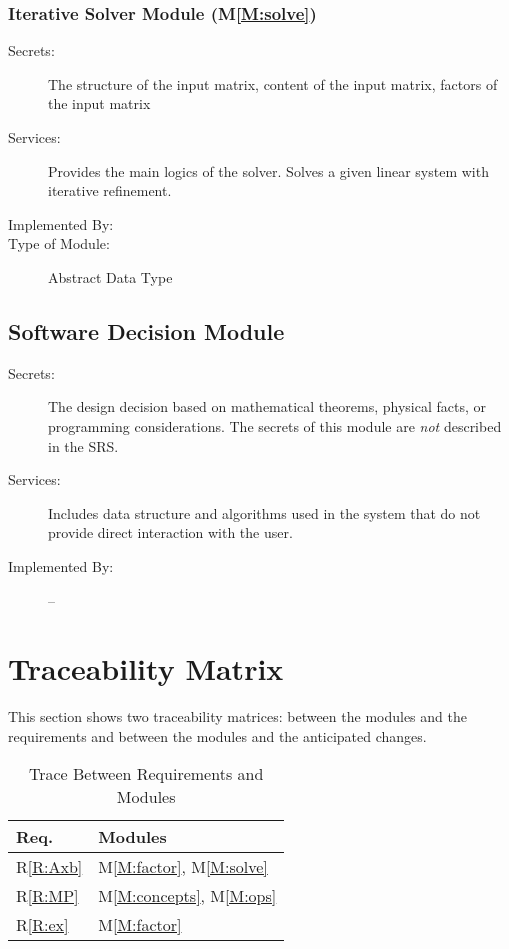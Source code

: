 \documentclass[12pt, titlepage]{article}
\newcommand{\rref}[1]{R\ref{#1}}
\newcommand{\acref}[1]{AC\ref{#1}}
\newcommand{\mref}[1]{M\ref{#1}}
\begin{document}
\subsubsection{Iterative Solver Module (\mref{M:solve})}

\begin{description}
\item[Secrets:] The structure of the input matrix, content of the input matrix,
  factors of the input matrix
\item[Services:] Provides the main logics of the solver. Solves a given linear
  system with iterative refinement.
\item[Implemented By:] \progname{}
\item[Type of Module:] Abstract Data Type
\end{description}

\subsection{Software Decision Module}

\begin{description}
\item[Secrets:] The design decision based on mathematical theorems, physical
  facts, or programming considerations. The secrets of this module are
  \emph{not} described in the SRS.
\item[Services:] Includes data structure and algorithms used in the system that
  do not provide direct interaction with the user.
\item[Implemented By:] --
\end{description}

\section{Traceability Matrix} \label{SecTM}

This section shows two traceability matrices: between the modules and the
requirements and between the modules and the anticipated changes.


\begin{table}[H]
  \centering
  \begin{tabular}{p{} p{}}
    \toprule
    \textbf{Req.}      & \textbf{Modules}                      \\
    \midrule
    \rref{R:Axb} & \mref{M:factor}, \mref{M:solve} \\
    \rref{R:MP}  & \mref{M:concepts}, \mref{M:ops} \\
    \rref{R:ex}  & \mref{M:factor}                 \\
    \bottomrule
  \end{tabular}
  \caption{Trace Between Requirements and Modules}
  \label{TblRT}
\end{table}
\end{document}
